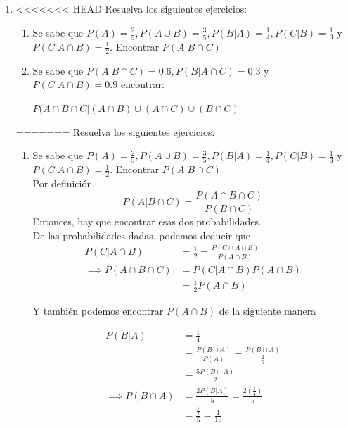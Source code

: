 \documentclass[12pt,a4paper]{report}
\begin{document}
\begin{enumerate}
  \item{
<<<<<<< HEAD
 Resuelva los siguientes ejercicios:\\
 \begin{enumerate}[label=\alph*) ]
 \item{Se sabe que $P(A)= \frac{2}{5},P(A\cup B)=\frac{3}{5},P(B|A)=\frac{1}{4},P(C|B)=\frac{1}{3}$ y $P(C|A\cap B)=\frac{1}{2}$. Encontrar $P(A|B\cap C)$}\\
 \item{Se sabe que $P(A|B\cap C)=0.6, P(B|A\cap C)=0.3$ y $P(C|A\cap B)=0.9$ encontrar: \\
 \begin{center}
 $P(A\cap B\cap C| (A\cap B) \cup (A\cap C) \cup (B\cap C)$
 \end{center} }
 \end{enumerate}
=======
		 Resuelva los siguientes ejercicios:\\
		 \begin{enumerate}[label=\alph*) ]
		 \item{
			Se sabe que $P(A)= \frac{2}{5},P(A\cup B)=\frac{3}{5},P(B|A)=\frac{1}{4},P(C|B)=\frac{1}{3}$ y $P(C|A\cap B)=\frac{1}{2}$. Encontrar $P(A|B\cap C)$\\

			Por definición,
			\begin{equation*}
				P(A|B \cap C) = \frac{P(A \cap B \cap C)}{P(B \cap C)}
			\end{equation*}
			Entonces, hay que encontrar esas dos probabilidades.\\

			De las probabilidades dadas, podemos deducir que
			\begin{align*}
				P(C|A\cap B) &= \frac{1}{2} = \frac{P(C \cap A \cap B)}{P(A \cap B)}  \\
				\implies  P(A \cap B \cap C) &= P(C|A\cap B) P(A \cap B)\\
																		 &= \frac{1}{2} P(A \cap B)
			\end{align*}

			Y también podemos encontrar $P(A \cap B)$ de la siguiente manera

			\begin{align*}
				P(B|A) &= \frac{1}{4} \\
							 &= \frac{P(B \cap A)}{P(A)} = \frac{P(B \cap A)}{\frac{2}{5}}\\
							 &= \frac{5P(B \cap A)}{2}\\
				\implies P(B \cap A) &= \frac{2P(B|A)}{5} = \frac{2(\frac{1}{4})}{5}\\
							 &= \frac{\frac{1}{2}}{5} = \frac{1}{10}
			\end{align*}

}
\end{enumerate}}
\end{enumerate}
\end{document}
